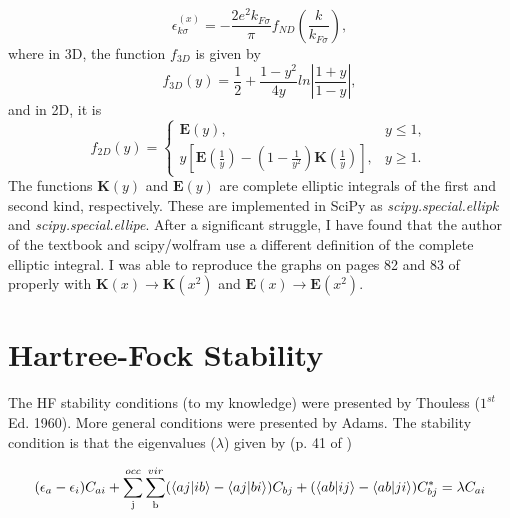 \documentclass{revtex4}
\begin{document}
\begin{equation}\label{eq:hfexch}
\epsilon_{k\sigma}^{(x)} = -\frac{2e^2k_{F\sigma}}{\pi}f_{ND}\left(\frac{k}{k_{F\sigma}}\right),
\end{equation}
where in 3D, the function $f_{3D}$ is given by
\begin{equation}
f_{3D}\left(y\right) = \frac{1}{2} + \frac{1-y^2}{4y} ln \left|\frac{1+y}{1-y} \right|,
\end{equation}
and in 2D, it is
\begin{equation}\label{eq:fnd}
f_{2D}\left(y\right) = 
\begin{cases} 
    \mathbf{E}\left(y\right), &  y \leq 1, \\
    y 
    \left[ 
        \mathbf{E} 
        \left(
            \frac{1}{y} 
        \right)
        -
        \left(
            1 - \frac{1}{y^2}
        \right)
        \mathbf{K}
        \left(
            \frac{1}{y}
        \right)
       \right]  ,& y \geq 1. 
\end{cases}
\end{equation}
The functions $\mathbf{K}(y)$ and $ \mathbf{E}(y) $ are complete elliptic integrals of the first and second kind, respectively. These are implemented in SciPy as \emph{scipy.special.ellipk} and \emph{scipy.special.ellipe}. After a significant struggle, I have found that the author of the textbook\cite{Guiliani2005} and scipy/wolfram use a different definition of the complete elliptic integral. I was able to reproduce the graphs on pages 82 and 83 of \cite{Guiliani2005} properly with $\mathbf{K}(x) \rightarrow \mathbf{K}(x^2)$ and $\mathbf{E}(x) \rightarrow \mathbf{E}(x^2)$.

\section{Hartree-Fock Stability}
The HF stability conditions (to my knowledge) were presented by Thouless \cite{Thouless1972} ($1^{st}$ Ed. 1960). More general conditions were presented by Adams\cite{Adams1962}. The stability condition is that the eigenvalues ($\lambda$) given by (p. 41 of \cite{Thouless1972}) 

\begin{equation}
(\epsilon_a-\epsilon_i)C_{ai} + \sum\limits_{\text{j}}^{occ}\sum\limits_{\text{b}}^{vir}
	(\braket{aj|ib}-\braket{aj|bi})C_{bj}
	+(\braket{ab|ij}-\braket{ab|ji})C_{bj}^*
	=\lambda C_{ai}
\end{equation}
\end{document}
